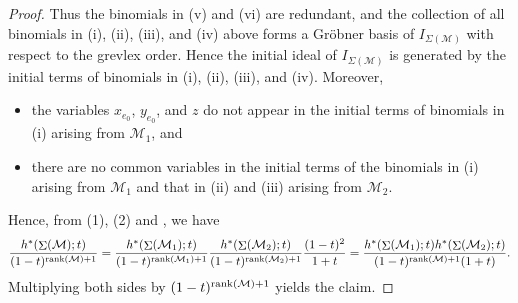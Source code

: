 \documentclass{amsart}
\numberwithin{equation}{section}
\theoremstyle{plain}
\theoremstyle{definition}
\DeclareMathOperator{\HS}{HS}
\DeclareMathOperator{\init}{in}
\newcommand{\CC}{\mathbb{C}}
\newcommand{\calM}{\mathcal{M}}
\DeclareMathOperator{\SEP}{\Sigma}
\begin{document}
\begin{proof}
Thus the binomials in (v) and (vi) are redundant, and the collection of all binomials in (i), (ii), (iii), and (iv)
above forms a Gr\"obner basis of $I_{\Sigma(\calM)}$ with respect to the grevlex order.
Hence the initial ideal of $I_{\Sigma(\calM)}$ is generated by the initial terms of binomials in (i), (ii), (iii), and (iv).
Moreover,
\begin{itemize}
    \item[(1)]
    the variables $x_{e_0}$, $y_{e_0}$, and $z$ do not appear in the initial terms of  binomials in (i) arising from $\calM_1$, and
    \item[(2)]
    there are no common variables in the initial terms of the binomials in (i) arising from $\calM_1$ and that in (ii) and (iii) arising from $\calM_2$.
\end{itemize}
%     
Hence, from (1), (2) and \cite[Lemma 43 and Proof of Theorem 44]{DDM}, we have 
     \[
\frac{h^*(\SEP(\calM);t)}{(1-t)^{{\rm rank}(\calM)+1}}
    = \frac{h^*(\SEP(\calM_1);t)}{(1-t)^{{\rm rank}(\calM_1)+1}} \frac{h^*(\SEP(\calM_2);t)}{(1-t)^{{\rm rank}(\calM_2)+1}}\frac{(1 - t)^2}{1 + t}
   = \frac{h^*(\SEP(\calM_1);t)h^*(\SEP(\calM_2);t)}{(1-t)^{{\rm rank}(\calM)+1} (1 + t)}.
    \]
     Multiplying both sides by $(1 - t)^{{\rm rank}(\calM)+1}$ yields the claim.
\end{proof}
\end{document}
